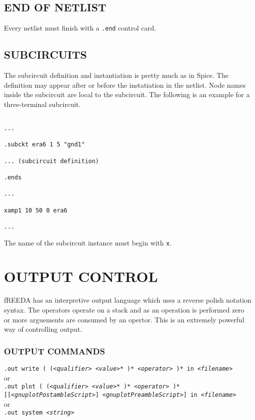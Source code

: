 \subsection[End of netlist]{END OF NETLIST} 
Every netlist must finish with a {\tt .end} control card.


\subsection[Subcircuits]{SUBCIRCUITS}

The subcircuit definition and instantiation is pretty much as in
Spice. The definition may appear after or before the instatiation in
the netlist. Node names inside the subcircuit are local to the
subcircuit.  The following is an example for a three-terminal
subcircuit.
\begin{verbatim}

...

.subckt era6 1 5 "gnd1"

... (subcircuit definition)

.ends

...

xamp1 10 50 0 era6

...
\end{verbatim}
The name of the subcircuit instance must begin with {\tt x}.


\section[Output Control]{OUTPUT CONTROL\label{sec_output}}

fREEDA has an interpretive output language which uses a reverse
polish notation syntax.  The operators operate on a stack and as an
operation is performed zero or more arguements are consumed by an
opertor.  This is an extremely powerful way of controlling output. 

\subsubsection[Output Commands]{OUTPUT COMMANDS}

{\tt .out write
( (<{\it qualifier}> <{\it value}>* )* <{\it operator}> )*
      in <{\it filename}>} \medskip
\\
or \medskip
\\
{\tt .out plot
( (<{\it qualifier}> <{\it value}>* )* <{\it operator}> )*
[[<{\it gnuplotPostambleScript}>] <{\it gnuplotPreambleScript}>] 
in <{\it filename}>} \medskip
\\
or \medskip
\\
{\tt .out system <{\it string}>} 

